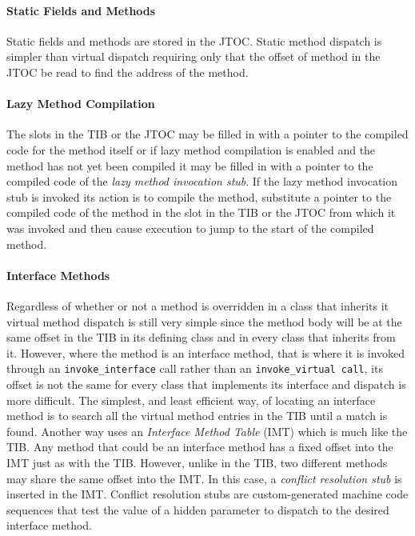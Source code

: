 \paragraph{Static Fields and Methods} 
Static fields and methods are stored in the JTOC. Static method dispatch is 
simpler than virtual dispatch requiring only that the offset of method in the 
JTOC be read to find the address of the method. 

\paragraph{Lazy Method Compilation}
The slots in the TIB or the JTOC may be filled in with 
a pointer to the compiled code for the method itself or if lazy method 
compilation is enabled and the method has not yet been compiled 
it may be filled in with
a pointer to the compiled code of the {\em lazy method invocation stub}.
If the lazy method invocation stub is invoked its action is to compile the 
method, substitute a pointer to the compiled code of the method in the slot in
the TIB or the JTOC from which it was invoked and then 
cause execution to jump to the start of the compiled method. 

\paragraph{Interface Methods}
Regardless of whether or not a method is overridden in a class that inherits it
virtual method dispatch is still very simple since the method body will be at
the same offset in the TIB in its defining class and in every class that 
inherits from it. 
However, where the method is an interface method, 
that is where it is invoked through an {\tt invoke\_interface} call rather than
an {\tt invoke\_virtual call}, its offset is not the same for every class that 
implements its interface and dispatch is more difficult.
The simplest, and least efficient way, of locating an interface method 
is to search all the virtual method entries in the TIB until a match is found.
Another way uses an {\em Interface Method Table} (IMT) which is much like the 
TIB. Any method that could be an interface method has a fixed offset into the 
IMT just as with the TIB. However, unlike in the TIB, two different methods may
share the same offset into the IMT. In this case, a {\em conflict resolution
stub} is inserted in the IMT. Conflict resolution stubs are
custom-generated machine code sequences that test the value of a
hidden parameter to dispatch to the desired interface method.


